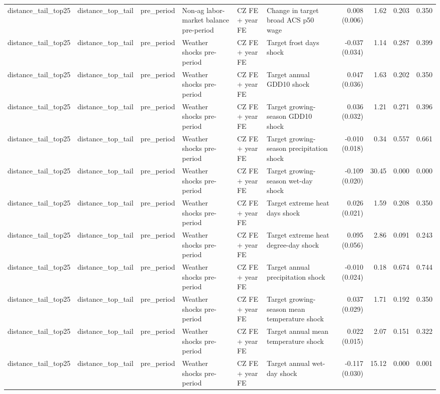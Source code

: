 \begin{tabular}{llllllrrrr}
distance_tail_top25 & distance_top_tail & pre_period & Non-ag labor-market balance pre-period & CZ FE + year FE & Change in target broad ACS p50 wage & 0.008 (0.006) & 1.62 & 0.203 & 0.350 \\
distance_tail_top25 & distance_top_tail & pre_period & Weather shocks pre-period & CZ FE + year FE & Target frost days shock & -0.037 (0.034) & 1.14 & 0.287 & 0.399 \\
distance_tail_top25 & distance_top_tail & pre_period & Weather shocks pre-period & CZ FE + year FE & Target annual GDD10 shock & 0.047 (0.036) & 1.63 & 0.202 & 0.350 \\
distance_tail_top25 & distance_top_tail & pre_period & Weather shocks pre-period & CZ FE + year FE & Target growing-season GDD10 shock & 0.036 (0.032) & 1.21 & 0.271 & 0.396 \\
distance_tail_top25 & distance_top_tail & pre_period & Weather shocks pre-period & CZ FE + year FE & Target growing-season precipitation shock & -0.010 (0.018) & 0.34 & 0.557 & 0.661 \\
distance_tail_top25 & distance_top_tail & pre_period & Weather shocks pre-period & CZ FE + year FE & Target growing-season wet-day shock & -0.109 (0.020) & 30.45 & 0.000 & 0.000 \\
distance_tail_top25 & distance_top_tail & pre_period & Weather shocks pre-period & CZ FE + year FE & Target extreme heat days shock & 0.026 (0.021) & 1.59 & 0.208 & 0.350 \\
distance_tail_top25 & distance_top_tail & pre_period & Weather shocks pre-period & CZ FE + year FE & Target extreme heat degree-day shock & 0.095 (0.056) & 2.86 & 0.091 & 0.243 \\
distance_tail_top25 & distance_top_tail & pre_period & Weather shocks pre-period & CZ FE + year FE & Target annual precipitation shock & -0.010 (0.024) & 0.18 & 0.674 & 0.744 \\
distance_tail_top25 & distance_top_tail & pre_period & Weather shocks pre-period & CZ FE + year FE & Target growing-season mean temperature shock & 0.037 (0.029) & 1.71 & 0.192 & 0.350 \\
distance_tail_top25 & distance_top_tail & pre_period & Weather shocks pre-period & CZ FE + year FE & Target annual mean temperature shock & 0.022 (0.015) & 2.07 & 0.151 & 0.322 \\
distance_tail_top25 & distance_top_tail & pre_period & Weather shocks pre-period & CZ FE + year FE & Target annual wet-day shock & -0.117 (0.030) & 15.12 & 0.000 & 0.001 \\

\end{tabular}
